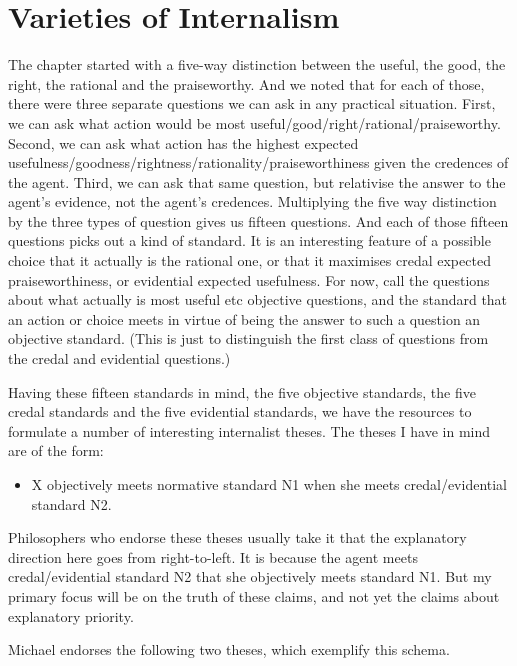 \section{Varieties of Internalism}
\label{varietiesofinternalism}

The chapter started with a five-way distinction between the useful, the good, the right, the rational and the praiseworthy. And we noted that for each of those, there were three separate questions we can ask in any practical situation. First, we can ask what action would be most useful\slash good\slash right\slash rational\slash praiseworthy. Second, we can ask what action has the highest expected usefulness\slash goodness\slash rightness\slash rationality\slash praiseworthiness given the credences of the agent. Third, we can ask that same question, but relativise the answer to the agent's evidence, not the agent's credences. Multiplying the five way distinction by the three types of question gives us fifteen questions. And each of those fifteen questions picks out a kind of standard. It is an interesting feature of a possible choice that it actually is the rational one, or that it maximises credal expected praiseworthiness, or evidential expected usefulness. For now, call the questions about what actually is most useful etc objective questions, and the standard that an action or choice meets in virtue of being the answer to such a question an objective standard. (This is just to distinguish the first class of questions from the credal and evidential questions.)

Having these fifteen standards in mind, the five objective standards, the five credal standards and the five evidential standards, we have the resources to formulate a number of interesting internalist theses. The theses I have in mind are of the form:

\begin{itemize}
\item{} X objectively meets normative standard N1 when she meets credal\slash evidential standard N2.

\end{itemize}
Philosophers who endorse these theses usually take it that the explanatory direction here goes from right-to-left. It is because the agent meets credal\slash evidential standard N2 that she objectively meets standard N1. But my primary focus will be on the truth of these claims, and not yet the claims about explanatory priority.

Michael \citet{Zimmerman2008} endorses the following two theses, which exemplify this schema.

